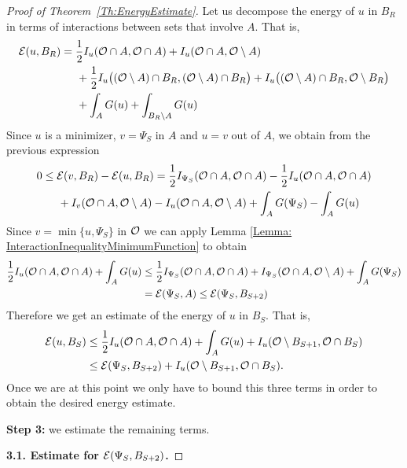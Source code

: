 \begin{proof}[Proof of Theorem~\ref{Th:EnergyEstimate}]
Let us decompose the energy of $u$ in $B_R$ in terms of interactions between sets that involve $A$. That is,
\begin{align*}
\mathcal{E}(u,B_R) &= \frac{1}{2}I_u(\mathcal{O} \cap A, \mathcal{O} \cap A) + I_u(\mathcal{O} \cap A, \mathcal{O} \setminus A) \\
& \hspace{5mm} + \frac{1}{2}I_u\big((\mathcal{O} \setminus A) \cap B_R, (\mathcal{O} \setminus A) \cap B_R\big) + I_u\big((\mathcal{O} \setminus A) \cap B_R, \mathcal{O} \setminus B_R\big) \\
& \hspace{5mm} + \int_A G(u) + \int_{B_R\setminus A} G(u)
\end{align*}
Since $u$ is a minimizer, $v=\Psi_S$ in $A$ and $u=v$ out of $A$, we obtain from the previous expression
\begin{align*}
0 &\leq \mathcal{E}(v,B_R)-\mathcal{E}(u,B_R) = \frac{1}{2}I_{\Psi_S}(\mathcal{O} \cap A, \mathcal{O} \cap A) - \frac{1}{2}I_u(\mathcal{O} \cap A, \mathcal{O} \cap A)\\
& \hspace{5mm} + I_v(\mathcal{O} \cap A, \mathcal{O} \setminus A) - I_u(\mathcal{O} \cap A, \mathcal{O} \setminus A) + \int_A G(\Psi_S) - \int_{A} G(u)
\end{align*}
Since $v = \min\{u,\Psi_S\}$ in $\mathcal{O}$ we can apply Lemma \ref{Lemma: InteractionInequalityMinimumFunction} to obtain
\begin{align*}
\frac{1}{2}I_u(\mathcal{O} \cap A, \mathcal{O} \cap A) + \int_{A} G(u) &\leq \frac{1}{2}I_{\Psi_S}(\mathcal{O} \cap A, \mathcal{O} \cap A) + I_{\Psi_S}(\mathcal{O} \cap A, \mathcal{O} \setminus A) + \int_A G(\Psi_S)  \\
&= \mathcal{E}(\Psi_S, A) \leq \mathcal{E}(\Psi_S,B_{S+2})
\end{align*}
Therefore we get an estimate of the energy of $u$ in $B_S$. That is,
\begin{align*}
\mathcal{E}(u,B_S) &\leq \frac{1}{2}I_u(\mathcal{O} \cap A, \mathcal{O} \cap A) + \int_{A} G(u) + I_u(\mathcal{O} \setminus B_{S+1}, \mathcal{O} \cap B_S) \\
& \leq  \mathcal{E}(\Psi_S,B_{S+2}) + I_u(\mathcal{O} \setminus B_{S+1}, \mathcal{O} \cap B_S).
\end{align*}
Once we are at this point we only have to bound this three terms in order to obtain the desired energy estimate.


\textbf{Step 3:} we estimate the remaining terms.

\textbf{3.1. Estimate for $\mathcal{E}(\Psi_S,B_{S+2})$.}



\end{proof}
